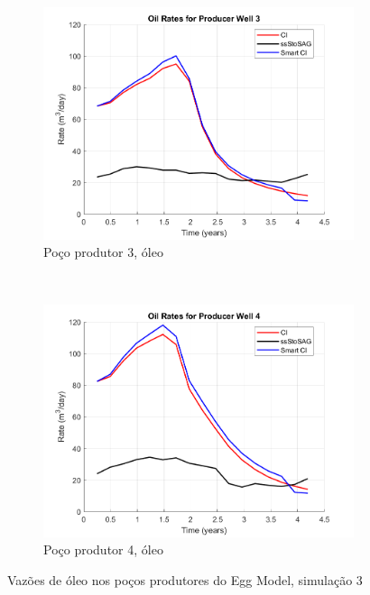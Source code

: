 \begin{figure}[!ht]
	\begin{subfigure}[b]{.45\textwidth}
		\includegraphics[width=\textwidth]{figs/resultadosEgg/imgsim3/EGG_OilWell3_Zoom}
		\caption{Po\c{c}o produtor 3, \'{o}leo}
		\label{EGG3_OilWell3}
	\end{subfigure}
	~
	\begin{subfigure}[b]{.45\textwidth}
		\includegraphics[width=\textwidth]{figs/resultadosEgg/imgsim3/EGG_OilWell4_Zoom}
		\caption{Po\c{c}o produtor 4, \'{o}leo}
		\label{EGG3_OilWell4}
	\end{subfigure}
	\caption{Vaz\~{o}es de \'{o}leo nos po\c{c}os produtores do Egg Model, simula\c{c}\~{a}o 3}
	\label{EGG3_OilRates}
\end{figure}

